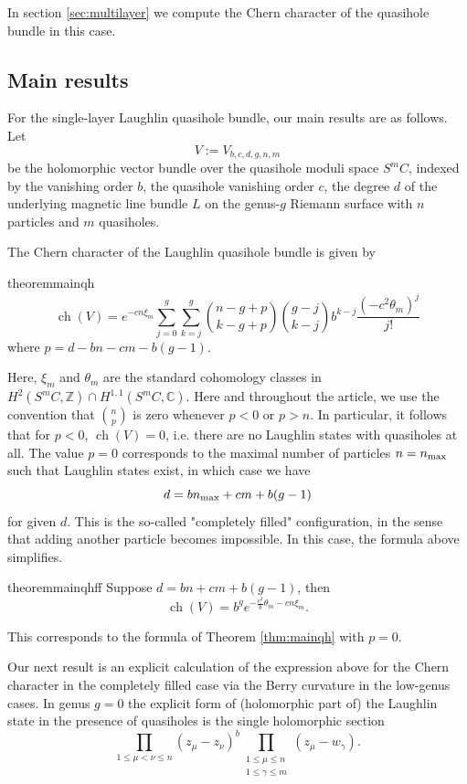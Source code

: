 \documentclass{article}
\theoremstyle{definition}
\DeclareMathOperator{\ch}{ch}
\begin{document}
In section \ref{sec:multilayer} we compute the Chern character of the quasihole bundle in this case.



\subsection{Main results}

For the single-layer Laughlin quasihole bundle, our main results are as follows. Let $$
V:=V_{b,c,d,g,n,m}$$ be the holomorphic vector bundle over the quasihole moduli space $S^mC $, indexed by the vanishing order $b$, the quasihole vanishing order $c$, the degree $d$ of the underlying magnetic line bundle $L$ on the genus-$g$ Riemann surface with $n$ particles and $m$ quasiholes.

The Chern character of the Laughlin quasihole bundle is given by





\begin{restatable}{theorem}{mainqh}\label{thm:mainqh}
    $$\ch(V)=e^{-c n \xi_m} \sum_{j=0}^g \sum_{k=j}^{g} \binom{n-g+p}{k-g+p}\binom{g-j}{k-j} b^{k-j} \frac{(-c^2\theta_m)^j}{j!} $$
where $p=d-bn-cm-b(g-1)$.
\end{restatable}
Here, $\xi_m$ and $\theta_m$ are the standard cohomology classes in $H^2(S^mC,\mathbb Z)\cap H^{1,1}(S^mC,\mathbb C)$. Here and throughout the article, we use the convention that $\binom{n}{p}$ is zero whenever $p<0$ or $p>n$. In particular, it follows that for $p<0$, $\ch(V)=0$, i.e. there are no Laughlin states with quasiholes at all. The value $p=0$ corresponds to the maximal number of particles $n=n_{\rm max}$ such that Laughlin states exist, in which case we have $$d=bn_{\rm max}+cm+b(g-1)$$ for given $d$. This is the so-called "completely filled" configuration, in the sense that adding another particle becomes impossible. In this case, the formula above simplifies.



\begin{restatable}{theorem}{mainqhff}
\label{thm:mainqhff}
    Suppose $d=bn+cm+b(g-1)$, then
    $$\ch(V)=b^g e^{-\frac{c^2}{b}\theta_m - c n \xi_m}.$$
\end{restatable}
This corresponds to the formula of Theorem \ref{thm:mainqh} with $p=0$. 



Our next result is an explicit calculation of the expression above for the Chern character in the completely filled case via the Berry curvature in the low-genus cases. In genus \(g=0\) the explicit form of (holomorphic part of) the Laughlin state in the presence of quasiholes is the single holomorphic section
\[
\prod_{1\leqslant\mu<\nu\leqslant n} (z_\mu - z_\nu)^b \prod_{\substack{1\leqslant\mu\leqslant n\\1\leqslant\gamma\leqslant m}}(z_\mu-w_\gamma).
\]
\end{document}
